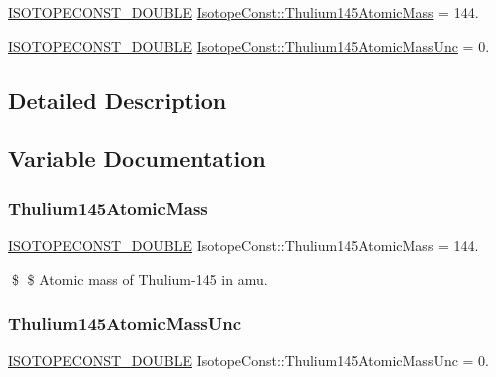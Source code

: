 \begin{DoxyCompactItemize}
\item 
\mbox{\hyperlink{group___isotope_const-_macros_ga8f45a7272ce02c0b4c65c44636ed719a}{I\+S\+O\+T\+O\+P\+E\+C\+O\+N\+S\+T\+\_\+\+D\+O\+U\+B\+LE}} \mbox{\hyperlink{group___isotope_const-_thulium-_tm145_ga4a95acd75ec0ad95a1e83a284700ab57}{Isotope\+Const\+::\+Thulium145\+Atomic\+Mass}} = 144.
\item 
\mbox{\hyperlink{group___isotope_const-_macros_ga8f45a7272ce02c0b4c65c44636ed719a}{I\+S\+O\+T\+O\+P\+E\+C\+O\+N\+S\+T\+\_\+\+D\+O\+U\+B\+LE}} \mbox{\hyperlink{group___isotope_const-_thulium-_tm145_ga4aeb62c43aea9baea46a17e0bc0b523a}{Isotope\+Const\+::\+Thulium145\+Atomic\+Mass\+Unc}} = 0.
\end{DoxyCompactItemize}


\subsection{Detailed Description}


\subsection{Variable Documentation}
\mbox{\label{group___isotope_const-_thulium-_tm145_ga4a95acd75ec0ad95a1e83a284700ab57}} 
\subsubsection{\texorpdfstring{Thulium145\+Atomic\+Mass}{Thulium145AtomicMass}}
{\footnotesize\ttfamily \mbox{\hyperlink{group___isotope_const-_macros_ga8f45a7272ce02c0b4c65c44636ed719a}{I\+S\+O\+T\+O\+P\+E\+C\+O\+N\+S\+T\+\_\+\+D\+O\+U\+B\+LE}} Isotope\+Const\+::\+Thulium145\+Atomic\+Mass = 144.}

\$ \$ Atomic mass of Thulium-\/145 in amu. \mbox{\label{group___isotope_const-_thulium-_tm145_ga4aeb62c43aea9baea46a17e0bc0b523a}} 
\subsubsection{\texorpdfstring{Thulium145\+Atomic\+Mass\+Unc}{Thulium145AtomicMassUnc}}
{\footnotesize\ttfamily \mbox{\hyperlink{group___isotope_const-_macros_ga8f45a7272ce02c0b4c65c44636ed719a}{I\+S\+O\+T\+O\+P\+E\+C\+O\+N\+S\+T\+\_\+\+D\+O\+U\+B\+LE}} Isotope\+Const\+::\+Thulium145\+Atomic\+Mass\+Unc = 0.}

